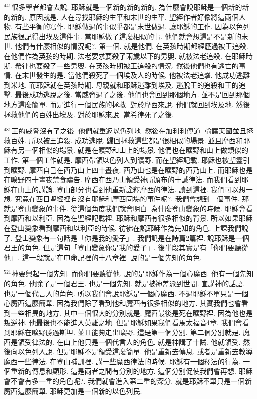 \documentclass{book}
\begin{document}
$^{441}$很多學者都會去說.
耶穌就是一個新的新的新的.
為什麼會說耶穌是一個新的新的新的.
原因就是.
人在尋找耶穌的生平和末世的生平.
聖經作者好像將這兩個人物.
有些平衡的寫作.
耶穌做過的事似乎都是末世做過.
讓耶穌的工作.
因為以色列民族很記得出埃及這件事.
當耶穌做了這麼相似的事.
他們就會想這是不是新的末世.
他們有什麼相似的情況呢?.
第一個.
就是他們.
在英孩時期都經歷過被王追殺.
在他們作為英孩的時期.
法老要求要殺了兩歲以下的男嬰.
就被法老追殺.
在耶穌時期.
希律也要殺了一些男嬰.
在英孩時期被王追殺的情況.
然後他們也有逃亡的事情.
在末世發生的是.
當他們殺死了一個埃及人的時候.
他被法老追擊.
他成功逃離到米地.
而耶穌就在英孩時期.
母親就和耶穌逃離到埃及.
逃脫王的追殺和王的追擊.
最後成功逃脫之後.
當威脅過了之後.
他們也會回到那個地方.
並不是回到那個地方這麼簡單.
而是進行一個民族的拯救.
對於摩西來說.
他們就回到埃及地.
然後拯救他們的百姓出埃及.
對於耶穌來說.
當希律死了之後.

$^{481}$王的威脅沒有了之後.
他們就重返以色列地.
然後在加利利傳道.
輸讓天國並且拯救百姓.
所以被王追殺.
成功逃脫.
歸回拯救這些都是很相似的場景.
並且摩西和耶穌有另一個相似的場景.
就是在曠野和山上的場景.
他們也在曠野和山上做類似的工作.
第一個工作就是.
摩西帶領以色列人到曠野.
而在聖經記載.
耶穌也被聖靈引到曠野.
摩西自己在西乃山上四十晝夜.
西乃山也是在曠野的西乃山上.
而耶穌也是在曠野四十晝夜禁食禱告.
摩西在西乃山領受神所頒布的十誡律法.
而我們看到耶穌在山上的講論.
登山部分也看到他重新詮釋摩西的律法.
讀到這裡.
我們可以想一想.
究竟在西日聖經裡有沒有耶穌和摩西同場的事件呢?.
我們會想到一個事件.
那就是登山變象的事件.
從這個角度我們就會明白.
為什麼登山變象的時候.
耶穌會看到摩西和以利亞.
因為在聖經記載裡.
耶穌和摩西有很多相似的背景.
所以如果耶穌在登山變象看到摩西和以利亞的時候.
彷彿在說耶穌作為先知的角色.
上課我們說了.
登山變象有一句話是「你是我的愛子」.
我們說是在詩篇2篇裡.
說耶穌是一個君王的角色.
但是這句「登山變象你是我的愛子」.
後半段其實是有「你們要聽從他」.
這一段就是在申命記裡的十八章裡.
說的是一個先知的角色.

$^{521}$神要興起一個先知.
而你們要聽從他.
說的是耶穌作為一個心魔西.
他有一個先知的角色.
他除了是一個君王.
也是一個先知.
就是被神差派到世間.
宣講神的話語.
也是一個代言人的角色.
所以我們會說耶穌是一個心魔西.
不過耶穌不單只是一個心魔西這麼簡單.
因為我們除了看到他和魔西有很多相似的地方.
其實我們也會看到一些相異的地方.
其中一個很大的分別就是.
魔西最後是死在曠野裡.
因為他也是叛逆神.
他最後也不能進入英雄之地.
但是耶穌如果我們看馬太福音4章.
我們會看到耶穌在曠野勝過斯坦.
並且能夠走出曠野.
這是第一個分別.
第二個分別就是.
魔西是領受律法的.
在山上他只是一個代言人的角色.
就是神講了十誡.
他就領受.
然後向以色列人說.
但是耶穌不是領受這麼簡單.
他是重新去傳息.
或者是重新去教導魔西一些律法.
在登山補訓裡.
講一些魔西律法的時候.
耶穌有一個釋法的行為.
一個重新的傳息和顯形.
這是兩者之間有分別的地方.
這個分別促使我們會再想.
耶穌會不會有多一重的角色呢?.
我們就會進入第二重的深分.
就是耶穌不單只是一個新魔西這麼簡單.
耶穌更加是一個新的以色列民.
\end{document}
